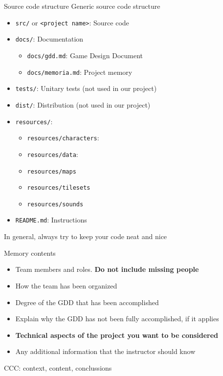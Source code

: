 \documentclass[10pt,compress]{beamer} %
\begin{document}
\begin{frame}{Source code structure}
	Generic source code structure
	\begin{itemize}
	\item \texttt{src/} or \texttt{<project name>}: Source code
	\item \texttt{docs/}: Documentation
		\begin{itemize}
		\item \texttt{docs/gdd.md}: Game Design Document
		\item \texttt{docs/memoria.md}: Project memory
		\end{itemize}
	\item \texttt{tests/}: Unitary tests (not used in our project)
	\item \texttt{dist/}: Distribution (not used in our project)
	\item \texttt{resources/}:
		\begin{itemize}
		\item \texttt{resources/characters}:
		\item \texttt{resources/data}:
		\item \texttt{resources/maps}
		\item \texttt{resources/tilesets}
		\item \texttt{resources/sounds}
		\end{itemize}
    \item \texttt{README.md}: Instructions
	\end{itemize}
   In general, always try to keep your code neat and nice
\end{frame}

\begin{frame}{Memory contents}
	\begin{itemize}
	\item Team members and roles. \textbf{Do not include missing people}
	\item How the team has been organized
	\item Degree of the GDD that has been accomplished
	\item Explain why the GDD has not been fully accomplished, if it applies
    \item \textbf{Technical aspects of the project you want to be considered}
    \item Any additional information that the instructor should know
	\end{itemize}
    
    \bigskip

    CCC: context, content, conclussions
\end{frame}
\end{document}
